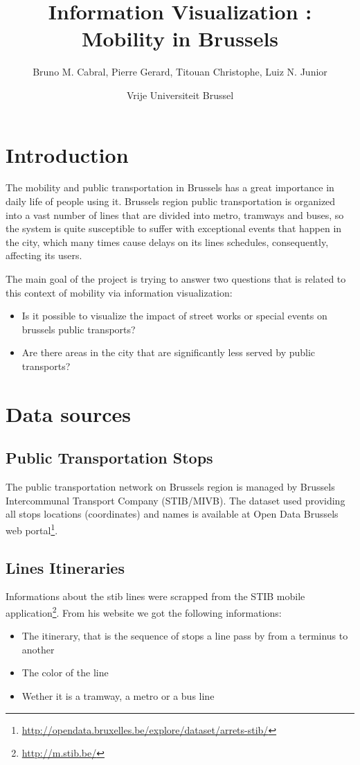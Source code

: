 \documentclass[12pt]{article}%
\begin{document}
\title{Information Visualization : Mobility in Brussels}
\author{Bruno M. Cabral, Pierre Gerard, Titouan Christophe, Luiz N. Junior}
\date{Vrije Universiteit Brussel}
\maketitle


\section{Introduction}
The mobility and public transportation in Brussels has a great importance in daily life of people using it.  Brussels region public transportation is organized into a vast number of lines that are divided into metro, tramways and buses, so the system is quite susceptible to suffer with exceptional events that happen in the city, which many times cause delays on its lines schedules, consequently, affecting its users.

The main goal of the project is trying to answer two questions that is related to this context of mobility via information visualization:

\begin{itemize}
	\item Is it possible to visualize the impact of street works or special events on brussels public transports?
	\item Are there areas in the city that are significantly less served by public transports?
\end{itemize}


\section{Data sources}
\subsection{Public Transportation Stops}
The public transportation network on Brussels region is managed by Brussels Intercommunal Transport Company (STIB/MIVB). The dataset used providing all stops locations (coordinates) and names is available at Open Data Brussels web portal\footnote{\url{http://opendata.bruxelles.be/explore/dataset/arrets-stib/}}.

\subsection{Lines Itineraries}
Informations about the stib lines were scrapped from the STIB mobile application\footnote{\url{http://m.stib.be/}}. From his website we got the following informations:
\begin{itemize}
    \item The itinerary, that is the sequence of stops a line pass by from a terminus to another
    \item The color of the line
    \item Wether it is a tramway, a metro or a bus line
\end{itemize}
\end{document}

